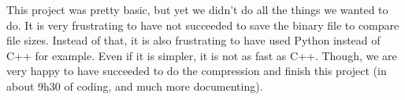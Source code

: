 This project was pretty basic, but yet we didn't do
all the things we wanted to do.
It is very frustrating to have not succeeded to save the binary
file to compare file sizes.
Instead of that, it is also frustrating to have used Python instead
of C++ for example. Even if it is simpler, it is not as fast as C++.
Though, we are very happy to have succeeded to do the compression
and finish this project (in about 9h30 of coding, and much more
documenting).